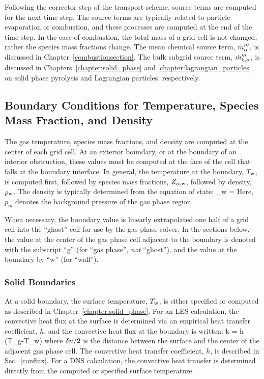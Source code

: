 Following the corrector step of the transport scheme, source terms are computed for the next time step.  The source terms are typically related to particle evaporation or combustion, and these processes are computed at the end of the time step. In the case of combustion, the total mass of a grid cell is not changed; rather the species mass fractions change. The mean chemical source term, $\dot{m}_{\alpha}'''$, is discussed in Chapter~\ref{combustionsection}.  The bulk subgrid source term, $\dot{m}_{\rm b,\alpha}'''$, is discussed in Chapters~\ref{chapter:solid_phase} and \ref{chapter:lagrangian_particles} on solid phase pyrolysis and Lagrangian particles, respectively.


\subsection{Boundary Conditions for Temperature, Species Mass Fraction, and Density}
\label{section:TZD_bc}

The gas temperature, species mass fractions, and density are computed at the center of each grid cell. At an exterior boundary, or at
the boundary of an interior obstruction, these values must be computed at the face of the cell that falls at the boundary interface. In general, the temperature at the boundary, $T_{\rm w}$, is computed first, followed by species mass fractions, $Z_{\rm \alpha,w}$, followed by density, $\rho_{\rm w}$. The density is typically determined from the equation of state:
\be  \rho_{\rm w} =   \ee
Here, $\overline{p}_m$ denotes the background pressure of the gas phase region.

When necessary, the boundary value is linearly extrapolated one half of a grid cell into the ``ghost'' cell for use by the gas phase solver. In the sections below, the value at the center of the gas phase cell adjacent to the boundary is denoted with the subscript ``g'' (for ``gas phase'', \emph{not} ``ghost''), and the value at the boundary by ``w'' (for ``wall'').

\subsubsection{Solid Boundaries}

At a solid boundary, the surface temperature, $T_{\rm w}$, is either specified or computed as described in Chapter~\ref{chapter:solid_phase}. For an LES calculation, the convective heat flux at the surface is determined via an empirical heat transfer coefficient, $h$, and the convective heat flux at the boundary is written:
\be
   k  = h \; (T_{\rm g}-T_{\rm w})  \label{ebal}
\ee
where $\delta n/2$ is the distance between the surface and the center of the adjacent gas phase cell. The convective heat transfer coefficient, $h$, is described in Sec.~\ref{conflux}. For a DNS calculation, the convective heat transfer is determined directly from the computed or specified surface temperature.

